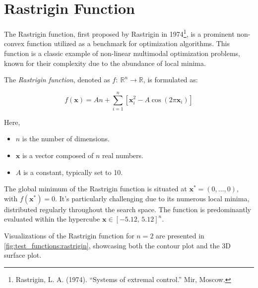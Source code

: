 \section{Rastrigin Function}
\label{sec:test_functions:rastrigin}

  The Rastrigin function, first proposed by Rastrigin in 1974\footnote{
    Rastrigin, L. A. (1974). \enquote{Systems of extremal control.} Mir, Moscow.
  }, is a prominent non-convex function utilized as a benchmark for optimization
  algorithms.
  This function is a classic example of non-linear multimodal optimization
  problems, known for their complexity due to the abundance of local minima.

  \begin{definition}
  \label{def:test_functions:rastrigin}
    The \emph{Rastrigin function}, denoted as \(f:\:\mathbb{R}^n \rightarrow 
    \mathbb{R}\), is formulated as:

    \begin{equation}
    \label{eq:test_functions:rastrigin}
      f(\mathbf{x}) = An + \sum_{i=1}^{n} \left[
        \mathbf{x}_i^2 - A\cos(2\pi \mathbf{x}_i)
      \right]
    \end{equation}
      
    Here, 
    \begin{itemize}
      \item \(n\) is the number of dimensions.
      \item \(\mathbf{x}\) is a vector composed of \(n\) real numbers.
      \item \(A\) is a constant, typically set to 10.
    \end{itemize}

  \end{definition}

  The global minimum of the Rastrigin function is situated at \(\mathbf{x}^* =
  (0, \ldots, 0)\), with \(f(\mathbf{x}^*) = 0\).
  It's particularly challenging due to its numerous local minima, distributed
  regularly throughout the search space. The function is predominantly evaluated
  within the hypercube \(\mathbf{x} \in [-5.12,\, 5.12]^n\).

  Visualizations of the Rastrigin function for \(n = 2\) are presented in
  \vref{fig:test_functions:rastrigin}, showcasing both the contour plot and the
  3D surface plot.

